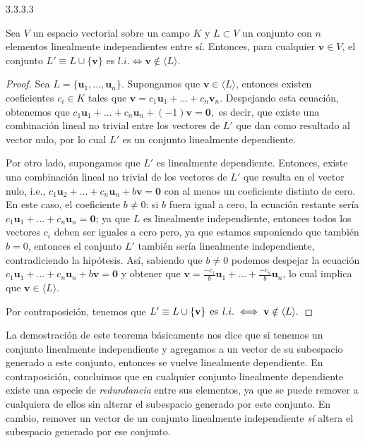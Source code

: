 \documentclass[apuntes]{subfiles}
\begin{document}
\begin{teo} {3.3.3.3}

Sea $V$ un espacio vectorial sobre un campo $K$ y $L\subset V$ un conjunto con $n$ elementos linealmente independientes entre sí. Entonces, para cualquier $\mathbf{v}\in V$, el conjunto $L'\equiv L\cup \{\mathbf{v}\}$ es $l.i. \iff \mathbf{v}\notin \langle L \rangle$.

\begin{proof}
Sea $L=\{\mathbf{u}_1, ... , \mathbf{u}_n\}.$ Supongamos que $\mathbf{v}\in\langle L \rangle$, entonces existen coeficientes $c_i\in K$ tales que $\mathbf{v}=c_1\mathbf{u}_1+...+c_n\mathbf{v}_n.$ Despejando esta ecuación, obtenemos que $c_1\mathbf{u}_1+...+c_n\mathbf{u}_n+(-1)\mathbf{v}=\mathbf{0},$ es decir, que existe una combinación lineal no trivial entre los vectores de $L'$ que dan como resultado al vector nulo, por lo cual $L'$ es un conjunto linealmente dependiente.

Por otro lado, supongamos que $L'$ es linealmente dependiente. Entonces, existe una combinación lineal no trivial de los vectores de $L'$ que resulta en el vector nulo, i.e., $c_1\mathbf{u}_2+...+c_n\mathbf{u}_n+b\mathbf{v}=\mathbf{0}$ con al menos un coeficiente distinto de cero. En este caso, el coeficiente $b\neq 0$: si $b$ fuera igual a cero, la ecuación restante sería $c_1\mathbf{u}_1+...+c_n\mathbf{u}_n=\mathbf{0}$; ya que $L$ es linealmente independiente, entonces todos los vectores $c_i$ deben ser iguales a cero pero, ya que estamos suponiendo que también $b=0$, entonces el conjunto $L'$ también sería linealmente independiente, contradiciendo la hipótesis. Así, sabiendo que $b\neq 0$ podemos despejar la ecuación $c_1\mathbf{u}_1+...+c_n\mathbf{u}_n+b\mathbf{v}=\mathbf{0}$ y obtener que $\mathbf{v}=\frac{-c_1}{b}\mathbf{u}_1+...+\frac{-c_n}{b}\mathbf{u}_n$, lo cual implica que $\mathbf{v}\in\langle L \rangle.$

    Por contraposición, tenemos que $L'\equiv L\cup\{\mathbf{v}\}\hspace{1.5mm}\text{es}\hspace{1.5mm} l.i.\iff \mathbf{v}\notin \langle L \rangle.$

\end{proof}

    La demostración de este teorema básicamente nos dice que si tenemos un conjunto linealmente independiente y agregamos a un vector de su subespacio generado a este conjunto, entonces se vuelve linealmente dependiente. En contraposición, concluimos que en cualquier conjunto linealmente dependiente existe una especie de \emph{redundancia} entre sus elementos, ya que se puede remover a cualquiera de ellos sin alterar el subespacio generado por este conjunto. En cambio, remover un vector de un conjunto linealmente independiente \emph{sí} altera el subespacio generado por ese conjunto.
\end{teo}
\end{document}
